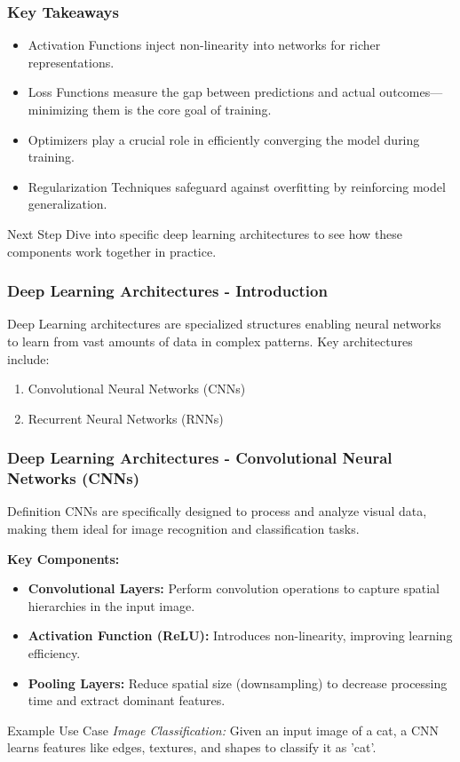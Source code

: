 \documentclass[aspectratio=169]{beamer}
\begin{document}
\begin{frame}[fragile]
    \frametitle{Key Takeaways}
    \begin{itemize}
        \item Activation Functions inject non-linearity into networks for richer representations.
        \item Loss Functions measure the gap between predictions and actual outcomes—minimizing them is the core goal of training.
        \item Optimizers play a crucial role in efficiently converging the model during training.
        \item Regularization Techniques safeguard against overfitting by reinforcing model generalization.
    \end{itemize}
    
    \begin{block}{Next Step}
        Dive into specific deep learning architectures to see how these components work together in practice.
    \end{block}
\end{frame}

\begin{frame}[fragile]
    \frametitle{Deep Learning Architectures - Introduction}
    Deep Learning architectures are specialized structures enabling neural networks to learn from vast amounts of data in complex patterns. 
    Key architectures include:
    \begin{enumerate}
        \item Convolutional Neural Networks (CNNs)
        \item Recurrent Neural Networks (RNNs)
    \end{enumerate}
\end{frame}

\begin{frame}[fragile]
    \frametitle{Deep Learning Architectures - Convolutional Neural Networks (CNNs)}
    \begin{block}{Definition}
        CNNs are specifically designed to process and analyze visual data, making them ideal for image recognition and classification tasks.
    \end{block}
    \textbf{Key Components:}
    \begin{itemize}
        \item \textbf{Convolutional Layers:} Perform convolution operations to capture spatial hierarchies in the input image.
        \item \textbf{Activation Function (ReLU):} Introduces non-linearity, improving learning efficiency.
        \item \textbf{Pooling Layers:} Reduce spatial size (downsampling) to decrease processing time and extract dominant features.
    \end{itemize}
    \begin{block}{Example Use Case}
        \textit{Image Classification:} Given an input image of a cat, a CNN learns features like edges, textures, and shapes to classify it as 'cat'.
    \end{block}
\end{frame}
\end{document}
